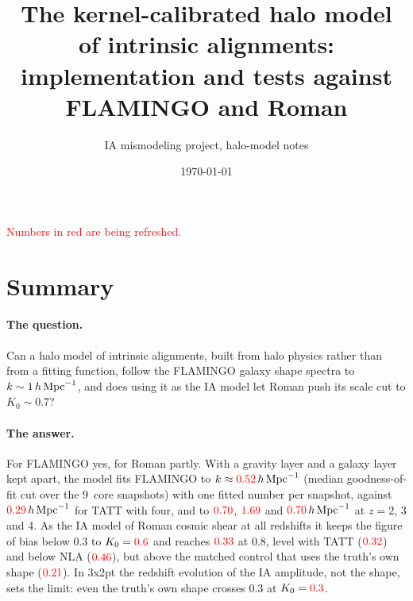 \documentclass[11pt]{article}
\title{The kernel-calibrated halo model of intrinsic alignments:\\
implementation and tests against FLAMINGO and Roman}
\author{IA mismodeling project, halo-model notes}
\date{\today}
\newcommand{\hMpc}{\,h\,{\rm Mpc}^{-1}}
\newif\ifnumbersfinal
\newcommand{\refresh}[1]{\ifnumbersfinal#1\else\textcolor{red}{#1}\fi}
\newcommand{\NsnapCore}{9}      %
\begin{document}
\maketitle
\ifnumbersfinal\else
\begin{center}\textcolor{red}{Numbers in red are being refreshed.}\end{center}
\fi

\section*{Summary}

\paragraph{The question.} Can a halo model of intrinsic alignments, built
from halo physics rather than from a fitting function, follow the FLAMINGO
galaxy shape spectra to $k\sim1\hMpc$, and does using it as the IA model
let Roman push its scale cut to $K_0\sim0.7$?

\paragraph{The answer.} For FLAMINGO yes, for Roman partly. With a gravity
layer and a galaxy layer kept apart, the model fits FLAMINGO to
$k\approx\refresh{\cutWgMed}\hMpc$ (median goodness-of-fit cut over the
\NsnapCore\ core snapshots) with one fitted number per snapshot, against
$\refresh{\cutTattMed}\hMpc$ for TATT with four, and to
$\refresh{\cutWgZTwo}$, $\refresh{\cutWgZThree}$ and
$\refresh{\cutWgZFour}\hMpc$ at $z=2$, 3 and 4. As the IA model of Roman
cosmic shear at all redshifts it keeps the figure of bias below 0.3 to
$K_0=\refresh{\KzeroCsWg}$ and reaches $\refresh{\fobCsWgEight}$ at 0.8,
level with TATT ($\refresh{\fobCsTattEight}$) and below NLA
($\refresh{\fobCsNlaEight}$), but above the matched control that uses the
truth's own shape ($\refresh{\fobCsCtrlEight}$). In 3x2pt the redshift
evolution of the IA amplitude, not the shape, sets the limit: even the
truth's own shape crosses 0.3 at $K_0=\refresh{\KzeroTxCtrl}$.
\end{document}
